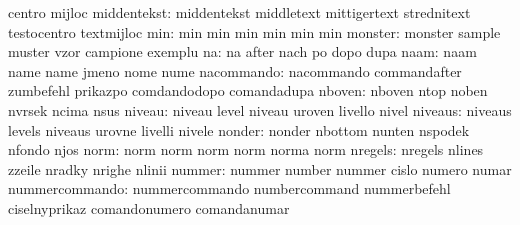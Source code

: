                            centro                    mijloc %
              middentekst: middentekst               middletext
                           mittigertext              strednitext
                           testocentro               textmijloc %
                      min: min                       min
                           min                       min
                           min                       min
                  monster: monster                   sample
                           muster                    vzor
                           campione                  exemplu
                       na: na                        after
                           nach                      po
                           dopo                      dupa
                     naam: naam                      name
                           name                      jmeno
                           nome                      nume
               nacommando: nacommando                commandafter
                           zumbefehl                 prikazpo
                           comdandodopo              comandadupa
                   nboven: nboven                    ntop
                           noben                     nvrsek
                           ncima                     nsus
                   niveau: niveau                    level
                           niveau                    uroven
                           livello                   nivel
                  niveaus: niveaus                   levels
                           niveaus                   urovne
                           livelli                   nivele
                   nonder: nonder                    nbottom
                           nunten                    nspodek
                           nfondo                    njos
                     norm: norm                      norm
                           norm                      norm
                           norma                     norm
                  nregels: nregels                   nlines
                           zzeile                    nradky
                           nrighe                    nlinii
                   nummer: nummer                    number
                           nummer                    cislo
                           numero                    numar
           nummercommando: nummercommando            numbercommand
                           nummerbefehl              ciselnyprikaz
                           comandonumero             comandanumar

